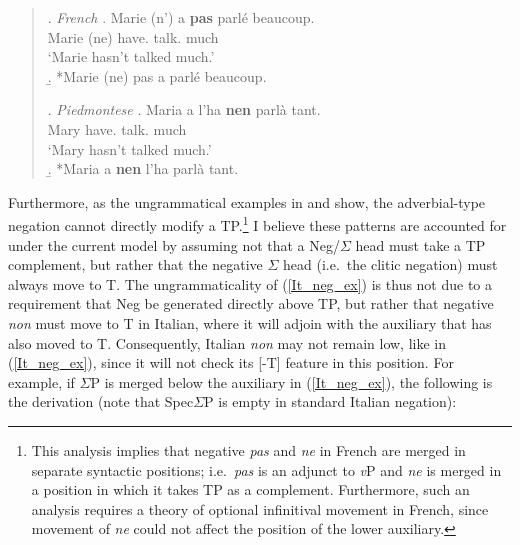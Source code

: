 \singlespacing
\begin{minipage}{5.5in}
\begin{quote}
\ex. {\it French}
\ag. Marie (n') a \textbf{pas} parl\'{e} beaucoup.\\
Marie (ne) have.\mbox{} \mbox{} talk.\mbox{} much\\
`Marie hasn't talked much.'\\
\b. *Marie (ne) pas a parl\'{e} beaucoup.

\ex. {\it Piedmontese}
\ag. Maria a l'ha \textbf{nen} parl\`{a} tant.\\
Mary \mbox{} have.\mbox{} \mbox{} talk.\mbox{} much\\
`Mary hasn't talked much.'\\
\b. *Maria a \textbf{nen} l'ha parl\`{a} tant.\\

\end{quote}
\end{minipage}
\onehalfspacing
Furthermore, as the ungrammatical examples in \LLast[b] and \Last[b] show, the adverbial-type negation cannot directly modify a TP.\footnote{This analysis implies that negative {\it pas} and {\it ne} in French are merged in separate syntactic positions; i.e.\ {\it pas} is an adjunct to {\it v}P and {\it ne} is merged in a position in which it takes TP as a complement. Furthermore, such an analysis requires a theory of optional infinitival movement in French, since movement of {\it ne} could not affect the position of the lower auxiliary.} I believe these patterns are accounted for under the current model by assuming not that a Neg/$\Sigma$ head must take a TP complement, but rather that the negative $\Sigma$ head (i.e.\ the clitic negation) must always move to T. The ungrammaticality of (\ref{It_neg_ex}) is thus not due to a requirement that Neg be generated directly above TP, but rather that negative {\it non} must move to T in Italian, where it will adjoin with the auxiliary that has also moved to T. Consequently, Italian {\it non} may not remain low, like in (\ref{It_neg_ex}), since it will not check its [-T] feature in this position. For example, if $\Sigma$P is merged below the auxiliary in (\ref{It_neg_ex}), the following is the derivation (note that Spec$\Sigma$P is empty in standard Italian negation):

